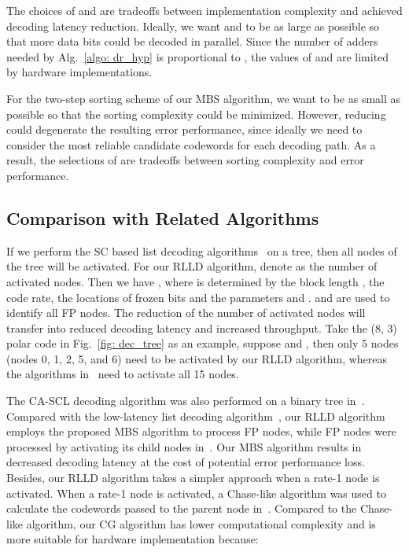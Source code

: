 \documentclass[journal]{IEEEtran}
\begin{document}
The choices of  and  are tradeoffs between implementation complexity and achieved decoding latency reduction. Ideally, we want  and  to be as large as possible so that more data bits could be decoded in parallel. Since the number of adders needed by Alg.~\ref{algo: dr_hyp} is proportional to , the values of  and  are limited by hardware implementations.

For the two-step sorting scheme of our MBS algorithm, we want  to be as small as possible so that the sorting complexity could be minimized. However, reducing  could degenerate the resulting error performance, since ideally we need to consider the  most reliable candidate codewords for each decoding path. As a result, the selections of  are tradeoffs between sorting complexity and error performance.


\subsection{Comparison with Related Algorithms} \label{sec: algo_cmp}
If we perform the SC based list decoding algorithms~\cite{ido_it, tree_list_dec} on a tree, then all  nodes of the tree will be activated. For our RLLD algorithm, denote  as the number of activated nodes. Then we have , where  is determined by the block length , the code rate, the locations of frozen bits and the parameters  and .  and  are used to identify all FP nodes. The reduction of the number of activated nodes will transfer into reduced decoding latency and increased throughput. Take the (8, 3) polar code in Fig.~\ref{fig: dec_tree} as an example, suppose  and , then only 5 nodes (nodes 0, 1, 2, 5, and 6) need to be activated by our RLLD algorithm, whereas the algorithms in~\cite{ido_it, tree_list_dec} need to activate all 15 nodes.



The CA-SCL decoding algorithm was also performed on a binary tree in~\cite{gabi_low_latency}. Compared with the low-latency list decoding algorithm~\cite{gabi_low_latency}, our RLLD algorithm employs the proposed MBS algorithm to process FP nodes, while FP nodes were processed by activating its child nodes in~\cite{gabi_low_latency}. Our MBS algorithm results in decreased decoding latency at the cost of potential error performance loss. Besides, our RLLD algorithm takes a simpler approach when a rate-1 node is activated.
When a rate-1 node is activated, a Chase-like algorithm was used to calculate the  codewords passed to the parent node in~\cite{gabi_low_latency}. Compared to the Chase-like algorithm, our CG algorithm has lower computational complexity and is more suitable for hardware implementation because:
\end{document}
